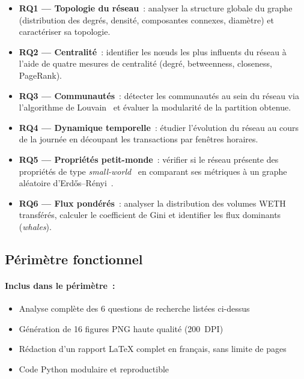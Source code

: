 \begin{itemize}
  \item \textbf{RQ1 --- Topologie du r\'eseau}~: analyser la structure globale du graphe (distribution des degr\'es, densit\'e, composantes connexes, diam\`etre) et caract\'eriser sa topologie.

  \item \textbf{RQ2 --- Centralit\'e}~: identifier les n\oe uds les plus influents du r\'eseau \`a l'aide de quatre mesures de centralit\'e (degr\'e, betweenness, closeness, PageRank).

  \item \textbf{RQ3 --- Communaut\'es}~: d\'etecter les communaut\'es au sein du r\'eseau via l'algorithme de Louvain~\cite{blondel2008louvain} et \'evaluer la modularit\'e de la partition obtenue.

  \item \textbf{RQ4 --- Dynamique temporelle}~: \'etudier l'\'evolution du r\'eseau au cours de la journ\'ee en d\'ecoupant les transactions par fen\^etres horaires.

  \item \textbf{RQ5 --- Propri\'et\'es petit-monde}~: v\'erifier si le r\'eseau pr\'esente des propri\'et\'es de type \textit{small-world}~\cite{watts1998smallworld} en comparant ses m\'etriques \`a un graphe al\'eatoire d'Erd\H{o}s--R\'enyi~\cite{erdos1959random}.

  \item \textbf{RQ6 --- Flux pond\'er\'es}~: analyser la distribution des volumes WETH transf\'er\'es, calculer le coefficient de Gini et identifier les flux dominants (\textit{whales}).
\end{itemize}


\subsection{P\'erim\`etre fonctionnel}

\paragraph{Inclus dans le p\'erim\`etre~:}
\begin{itemize}
  \item Analyse compl\`ete des 6 questions de recherche list\'ees ci-dessus
  \item G\'en\'eration de 16 figures PNG haute qualit\'e (200~DPI)
  \item R\'edaction d'un rapport LaTeX complet en fran\c{c}ais, sans limite de pages
  \item Code Python modulaire et reproductible
\end{itemize}

